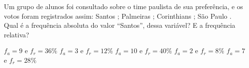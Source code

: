Um grupo de alunos foi consultado sobre o time paulista de sua preferência, e os votos foram registrados assim: Santos ; Palmeiras ; Corinthians ; São Paulo . Qual é a frequência absoluta do valor ``Santos'', dessa variável? E a frequência relativa?

$f_a = 9$ e $f_r = 36\%$
$f_a = 3$ e $f_r = 12\%$
$f_a = 10$ e $f_r = 40\%$
$f_a = 2$ e $f_r = 8\%$
$f_a = 7$ e $f_r = 28\%$
